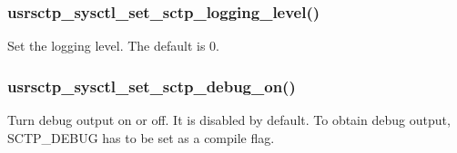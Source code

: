 \documentclass[a4paper]{article}
\begin{document}
\subsubsection{usrsctp\_sysctl\_set\_sctp\_logging\_level()}
Set the logging level. The default is 0.


\subsubsection{usrsctp\_sysctl\_set\_sctp\_debug\_on()}
Turn debug output on or off. It is disabled by default. To obtain debug output,
SCTP\_DEBUG has to be set as a compile flag.

						
\end{document}
